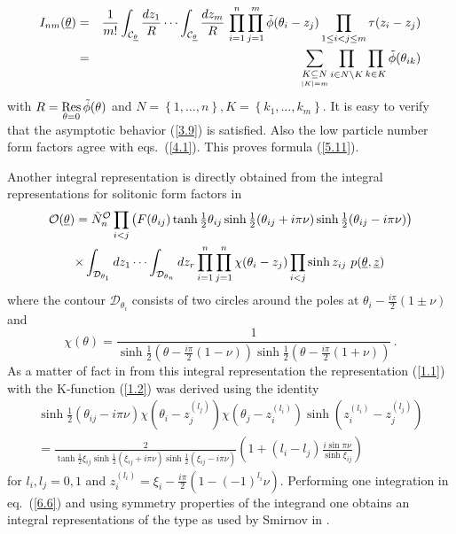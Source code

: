 \documentclass[a4paper,a4paper]{article}
\begin{document}
\begin{eqnarray*}
I_{nm}(\underline{\theta }) &=&\frac{1}{m!}\int_{\mathcal{C}_{\underline{%
\theta }}}\frac{dz_{1}}{R}\cdots \int_{\mathcal{C}_{\underline{\theta }}}%
\frac{dz_{m}}{R}\,\prod_{i=1}^{n}\prod_{j=1}^{m}\tilde{\phi}(\theta
_{i}-z_{j})\prod_{1\le i<j\le m}\tau (z_{i}-z_{j}) \\
&=&\sum_{\mathrel{\mathop{K\subseteq N}\limits_{|K|=m}}}\prod_{i\in
N\setminus K}\prod_{k\in K}\tilde{\phi}(\theta _{ik})
\end{eqnarray*}
with $R=\mathop{\rm Res}\limits_{\theta =0}\tilde{\phi}(\theta )$ and $%
N=\left\{ 1,\dots ,n\right\} ,K=\left\{ k_{1},\dots ,k_{m}\right\} $. It is
easy to verify that the asymptotic behavior (\ref{3.9}) is satisfied. Also
the low particle number form factors agree with eqs.~(\ref{4.1}). This
proves formula (\ref{5.11}).

Another integral representation is directly obtained from the integral
representations for solitonic form factors in \cite{BK} 
\begin{multline}
\mathcal{O}(\underline{\theta })=\tilde{N}_{n}^{\mathcal{O}%
}\prod_{i<j}\left( F(\theta _{ij})\tanh \tfrac{1}{2}\theta _{ij}\sinh \tfrac{%
1}{2}(\theta _{ij}+i\pi \nu )\sinh \tfrac{1}{2}(\theta _{ij}-i\pi \nu
)\right) \\
\times \int_{\mathcal{D}_{\theta _{1}}}dz_{1}\cdots \int_{\mathcal{D}%
_{\theta _{n}}}dz_{r}\prod_{i=1}^{n}\prod_{j=1}^{n}\chi (\theta
_{i}-z_{j})\prod_{i<j}\sinh z_{ij}\,\,p(\underline{\theta },\underline{z})\,
\label{6.6}
\end{multline}
where the contour $\mathcal{D}_{\theta _{i}}$ consists of two circles around
the poles at $\theta _{i}-\frac{i\pi }{2}(1\pm \nu )$ and 
\[
\chi (\theta )=\frac{1}{\sinh \frac{1}{2}(\theta -\frac{i\pi }{2}(1-\nu
))\sinh \frac{1}{2}(\theta -\frac{i\pi }{2}(1+\nu ))}\,. 
\]
As a matter of fact in \cite{BK} from this integral representation the
representation (\ref{1.1}) with the K-function (\ref{1.2}) was derived using
the identity 
\begin{multline*}
\sinh \tfrac{1}{2}(\theta _{ij}-i\pi \nu )\chi (\theta
_{i}-z_{j}^{(l_{j})})\chi (\theta _{j}-z_{i}^{(l_{i})})\sinh
(z_{i}^{(l_{i})}-z_{j}^{(l_{j})}) \\
=\frac{2}{\tanh \tfrac{1}{2}\xi _{ij}\sinh \tfrac{1}{2}(\xi _{ij}+i\pi \nu
)\sinh \tfrac{1}{2}(\xi _{ij}-i\pi \nu )}\left( 1+(l_{i}-l_{j})\frac{i\sin
\pi \nu }{\sinh \xi _{ij}}\right)
\end{multline*}
for $l_{i},l_{j}=0,1$ and $z_{i}^{(l_{i})}=\xi _{i}-\frac{i\pi }{2}%
(1-(-1)^{l_{i}}\nu )$. Performing one integration in eq.~(\ref{6.6}) and
using symmetry properties of the integrand one obtains an integral
representations of the type as used by Smirnov in \cite{Sm1}.
\end{document}
